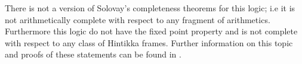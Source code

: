 \documentclass[../main.tex]{subfiles}
\begin{document}
	There is not a version of Solovay's completeness theorems for this
	logic; i.e it is not arithmetically complete with respect to any
	fragment of arithmetics. Furthermore this logic  do not have the fixed point property and
	is not complete with respect to any class of Hintikka frames. Further
	information on this topic and proofs of these statements can be found
	in \parencite{Boolos1993}.
\end{document}
